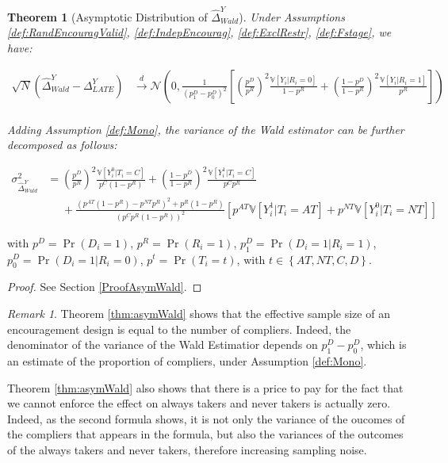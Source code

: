 \documentclass[
]{book}
\newcommand{\var}[1]{\mathbb{V}[ #1 ]}
\newtheorem{theorem}{Theorem}[chapter]
\theoremstyle{definition}
\theoremstyle{definition}
\theoremstyle{definition}
\theoremstyle{definition}
\theoremstyle{remark}
\newtheorem*{remark}{Remark}
\begin{document}
\begin{theorem}[Asymptotic Distribution of $\hat{\Delta}^Y_{Wald}$]
\protect\hypertarget{thm:asymWald}{}{\label{thm:asymWald} \iffalse (Asymptotic Distribution of \(\hat{\Delta}^Y_{Wald}\)) \fi{} }Under Assumptions \ref{def:RandEncouragValid}, \ref{def:IndepEncourag}, \ref{def:ExclRestr}, \ref{def:Fstage}, we have:

\begin{align*}
  \sqrt{N}(\hat{\Delta}^Y_{Wald}-\Delta^Y_{LATE}) &  \stackrel{d}{\rightarrow}
  \mathcal{N}\left(0,\frac{1}{(p^D_1-p^D_0)^2}\left[\left(\frac{p^D}{p^R}\right)^2\frac{\var{Y_i|R_i=0}}{1-p^R}+\left(\frac{1-p^D}{1-p^R}\right)^2\frac{\var{Y_i|R_i=1}}{p^R}\right]\right)\\
\end{align*}

Adding Assumption \ref{def:Mono}, the variance of the Wald estimator can be further decomposed as follows:

\begin{align*}
\sigma^2_{\hat{\Delta}^Y_{Wald}}  & = \left(\frac{p^D}{p^R}\right)^2\frac{\var{Y_i^0|T_i=C}}{p^C(1-p^R)}+\left(\frac{1-p^D}{1-p^R}\right)^2\frac{\var{Y^1_i|T_i=C}}{p^Cp^R}\\
                                  & \phantom{=} +\frac{(p^{AT}(1-p^R)-p^{NT}p^R)^2+p^R(1-p^R)}{(p^Cp^R(1-p^R))^2}\left[p^{AT}\var{Y_i^1|T_i=AT}+p^{NT}\var{Y^0_i|T_i=NT}\right]
\end{align*}
\end{theorem}

with \(p^D=\Pr(D_i=1)\), \(p^R=\Pr(R_i=1)\), \(p^{D}_1=\Pr(D_i=1|R_i=1)\), \(p^{D}_0=\Pr(D_i=1|R_i=0)\), \(p^t=\Pr(T_i=t)\), with \(t\in\left\{AT,NT,C,D\right\}\).

\begin{proof}
\iffalse{} {Proof. } \fi{}See Section \ref{ProofAsymWald}.
\end{proof}

\begin{remark}
\iffalse{} {Remark. } \fi{}Theorem \ref{thm:asymWald} shows that the effective sample size of an encouragement design is equal to the number of compliers.
Indeed, the denominator of the variance of the Wald Estimatior depends on \(p^D_1-p^D_0\), which is an estimate of the proportion of compliers, under Assumption \ref{def:Mono}.

Theorem \ref{thm:asymWald} also shows that there is a price to pay for the fact that we cannot enforce the effect on always takers and never takers is actually zero.
Indeed, as the second formula shows, it is not only the variance of the oucomes of the compliers that appears in the formula, but also the variances of the outcomes of the always takers and never takers, therefore increasing sampling noise.
\end{remark}
\end{document}
